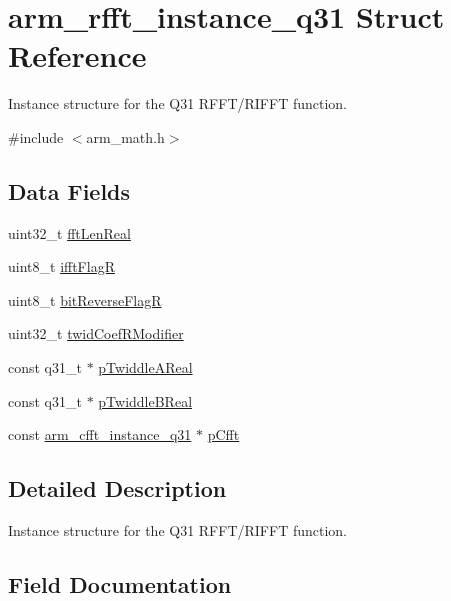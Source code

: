 \hypertarget{structarm__rfft__instance__q31}{}\section{arm\+\_\+rfft\+\_\+instance\+\_\+q31 Struct Reference}
\label{structarm__rfft__instance__q31}


Instance structure for the Q31 R\+F\+F\+T/\+R\+I\+F\+FT function.  




{\ttfamily \#include $<$arm\+\_\+math.\+h$>$}

\subsection*{Data Fields}
\begin{DoxyCompactItemize}
\item 
uint32\+\_\+t \mbox{\hyperlink{structarm__rfft__instance__q31_adf0d4604cf5546075d9d4cf122d6c986}{fft\+Len\+Real}}
\item 
uint8\+\_\+t \mbox{\hyperlink{structarm__rfft__instance__q31_a787d72055c89e4d62b188d6bd646341c}{ifft\+FlagR}}
\item 
uint8\+\_\+t \mbox{\hyperlink{structarm__rfft__instance__q31_ad56ec2425e2422108b8767b43d944591}{bit\+Reverse\+FlagR}}
\item 
uint32\+\_\+t \mbox{\hyperlink{structarm__rfft__instance__q31_a5b06f7f76c018db993fe6acc5708c589}{twid\+Coef\+R\+Modifier}}
\item 
const q31\+\_\+t $\ast$ \mbox{\hyperlink{structarm__rfft__instance__q31_ae0a31403d6a5d850adc926af9508d762}{p\+Twiddle\+A\+Real}}
\item 
const q31\+\_\+t $\ast$ \mbox{\hyperlink{structarm__rfft__instance__q31_a47ffe031454baeb52b1f5ce1a16e165a}{p\+Twiddle\+B\+Real}}
\item 
const \mbox{\hyperlink{structarm__cfft__instance__q31}{arm\+\_\+cfft\+\_\+instance\+\_\+q31}} $\ast$ \mbox{\hyperlink{structarm__rfft__instance__q31_aa583d759b8b176ad1696b27eb5821daf}{p\+Cfft}}
\end{DoxyCompactItemize}


\subsection{Detailed Description}
Instance structure for the Q31 R\+F\+F\+T/\+R\+I\+F\+FT function. 

\subsection{Field Documentation}
\mbox{\label{structarm__rfft__instance__q31_ad56ec2425e2422108b8767b43d944591}} 

